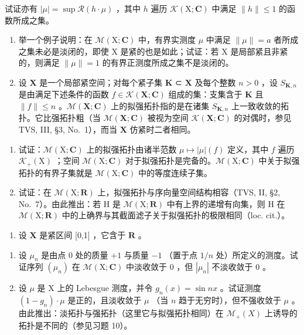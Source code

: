 试证亦有 \(|\mu| = \sup \mathcal{R}(h \cdot \mu)\) ，其中 \(h\) 遍历 \(\mathcal{K}(\mathrm{X};\mathbf{C})\) 中满足 \(\| h\| \leqslant 1\) 的函数所成之集。

\begin{enumerate}
\def\labelenumi{\arabic{enumi})}
\setcounter{enumi}{6}
\item
  举一个例子说明：在 \(\mathcal{M}(\mathrm{X};\mathbf{C})\) 中，有界实测度 \(\mu\) 中满足 \(\|\mu\|=a\) 者所成之集未必是淡闭的，即使 X 是紧的也是如此；试证：若 X 是局部紧且非紧的，则满足 \(\|\mu\|=1\) 的有界正测度所成之集不是淡闭的。
\item
  设 \(\mathbf{X}\) 是一个局部紧空间；对每个紧子集 \(\mathbf{K}\) ⊂ \(\mathbf{X}\) 及每个整数 \(n > 0\) ，设 \(S_{\mathbf{K},n}\) 是由满足下述条件的函数 \(f \in \mathcal{K}(\mathbf{X};\mathbf{C})\) 组成的集：支集含于 \(\mathbf{K}\) 且 \(\| f\| \leqslant n\) 。\(\mathcal{M}(\mathbf{X};\mathbf{C})\) 上的拟强拓扑指的是在诸集 \(S_{\mathbf{K},n}\) 上一致收敛的拓扑。它比强拓扑粗（当 \(\mathcal{M}(\mathbf{X};\mathbf{C})\) 被视为空间 \(\mathcal{K}(\mathbf{X};\mathbf{C})\) 的对偶时，参见 TVS, III, §3, No.~1），而当 \(\mathbf{X}\) 仿紧时二者相同。
\end{enumerate}

\begin{enumerate}
\def\labelenumi{\alph{enumi})}
\item
  试证：\(\mathcal{M}(\mathrm{X};\mathbf{C})\) 上的拟强拓扑由诸半范数 \(\mu \mapsto |\mu |(f)\) 定义，其中 \(f\) 遍历 \(\mathcal{K}_{+}(\mathrm{X})\) ；空间 \(\mathcal{M}(\mathrm{X};\mathbf{C})\) 对于拟强拓扑是完备的。\(\mathcal{M}(\mathrm{X};\mathbf{C})\) 中关于拟强拓扑的有界子集就是 \(\mathcal{M}(\mathrm{X};\mathbf{C})\) 中的等度连续子集。
\item
  试证：在 \(\mathcal{M}(\mathrm{X};\mathbf{R})\) 上，拟强拓扑与序向量空间结构相容（TVS, II, §2, No.~7）。由此推出：若 H 是 \(\mathcal{M}(\mathrm{X};\mathbf{R})\) 中有上界的递增有向集，则 H 在 \(\mathcal{M}(\mathrm{X};\mathbf{R})\) 中的上确界与其截面滤子关于拟强拓扑的极限相同（loc. cit.）。
\end{enumerate}

\begin{enumerate}
\def\labelenumi{\arabic{enumi})}
\setcounter{enumi}{8}
\tightlist
\item
  设 \(\mathbf{X}\) 是紧区间 {[}0,1{]} ，它含于 \(\mathbf{R}\) 。
\end{enumerate}

\begin{enumerate}
\def\labelenumi{\alph{enumi})}
\item
  设 \(\mu_{n}\) 是由点 0 处的质量 \(+1\) 与质量 \(-1\) （置于点 \(1/n\) 处）所定义的测度。试证序列 \((\mu_{n})\) 在 \(\mathcal{M}(\mathrm{X};\mathbf{C})\) 中淡收敛于 0 ，但 \(|\mu_n|\) 不淡收敛于 0 。
\item
  设 \(\mu\) 是 X 上的 Lebesgue 测度，并令 \(g_{n}(x) = \sin nx\) 。试证测度 \((1 - g_{n}) \cdot \mu\) 是正的，且淡收敛于 \(\mu\) （当 \(n\) 趋于无穷时），但不强收敛于 \(\mu\) 。由此推出：淡拓扑与强拓扑（这里它与拟强拓扑相同）在 \(\mathcal{M}_{+}(X)\) 上诱导的拓扑是不同的（参见习题 10）。
\end{enumerate}

